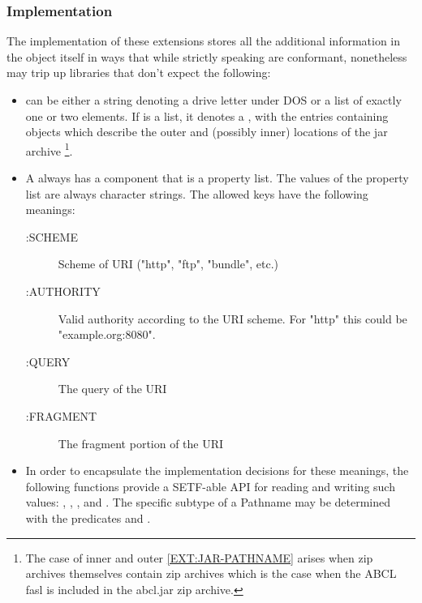\documentclass[10pt]{book}
\begin{document}

\subsubsection{Implementation}

The implementation of these extensions stores all the additional
information in the  object itself in ways that while strictly
speaking are conformant, nonetheless may trip up libraries that don't
expect the following:

\begin{itemize}
\item {} can be either a string denoting a drive letter
  under \textsc{DOS} or a list of exactly one or two elements.  If
   is a list, it denotes a , with
  the entries containing  objects which describe the
  outer and (possibly inner) locations of the jar
  archive \footnote{The case of inner and outer
     \ref{EXT:JAR-PATHNAME} arises when zip
    archives themselves contain zip archives which is the case when
    the ABCL fasl is included in the abcl.jar zip archive.}.

\item A  always has a  component that is a
  property list.  The values of the  property list are
  always character strings.  The allowed keys have the following meanings:
  \begin{description}
  \item[:SCHEME] Scheme of URI ("http", "ftp", "bundle", etc.)
  \item[:AUTHORITY] Valid authority according to the URI scheme.  For
    "http" this could be "example.org:8080". 
  \item[:QUERY] The query of the \textsc{URI} 
  \item[:FRAGMENT] The fragment portion of the \textsc{URI}
  \end{description}

\item In order to encapsulate the implementation decisions for these
  meanings, the following functions provide a SETF-able API for
  reading and writing such values: ,
  , , and
  .  The specific subtype of a Pathname may
  be determined with the predicates  and
  .

\label{EXTENSIONS:URL-PATHNAME-SCHEME}

\label{EXTENSIONS:URL-PATHNAME-FRAGMENT}

\label{EXTENSIONS:URL-PATHNAME-AUTHORITY}

\label{EXTENSIONS:PATHNAME-URL-P}

\label{EXTENSIONS:URL-PATHNAME-QUERY}

\end{itemize}
\end{document}
